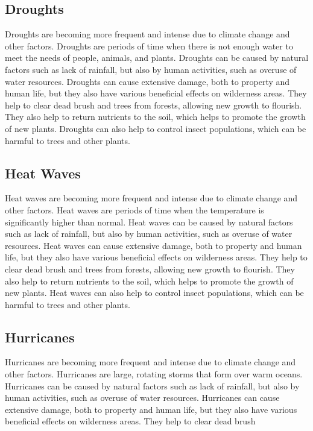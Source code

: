\documentclass{article}
\begin{document}
\subsection{Droughts}
Droughts are becoming more frequent and intense due to climate change and other
factors. Droughts are periods of time when there is not enough water to meet
the needs of people, animals, and plants. Droughts can be caused by natural
factors such as lack of rainfall, but also by human activities, such as overuse
of water resources. Droughts can cause extensive damage, both to property and
human life, but they also have various beneficial effects on wilderness areas.
They help to clear dead brush and trees from forests, allowing new growth to
flourish. They also help to return nutrients to the soil, which helps to
promote the growth of new plants. Droughts can also help to control insect
populations, which can be harmful to trees and other plants.

\subsection{Heat Waves}
Heat waves are becoming more frequent and intense due to climate change and
other factors. Heat waves are periods of time when the temperature is
significantly higher than normal. Heat waves can be caused by natural factors
such as lack of rainfall, but also by human activities, such as overuse of
water resources. Heat waves can cause extensive damage, both to property and
human life, but they also have various beneficial effects on wilderness areas.
They help to clear dead brush and trees from forests, allowing new growth to
flourish. They also help to return nutrients to the soil, which helps to
promote the growth of new plants. Heat waves can also help to control insect
populations, which can be harmful to trees and other plants.

\subsection{Hurricanes}
Hurricanes are becoming more frequent and intense due to climate change and
other factors. Hurricanes are large, rotating storms that form over warm
oceans. Hurricanes can be caused by natural factors such as lack of rainfall,
but also by human activities, such as overuse of water resources. Hurricanes
can cause extensive damage, both to property and human life, but they also have
various beneficial effects on wilderness areas. They help to clear dead brush
\end{document}
